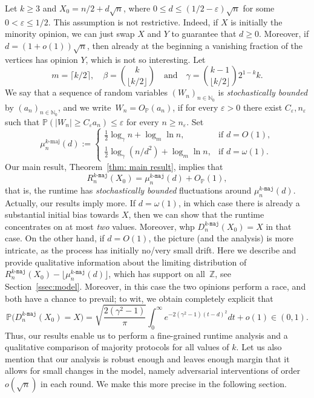 \documentclass[11pt]{article}
\newcommand{\Prob}{\mathbb{P}}
\numberwithin{theorem}{section}
\begin{document}
Let $k\geq 3$ and $X_0 = n/2 + d \sqrt{n}$, where $0 \le d \le (1/2-\varepsilon)\sqrt{n}$ for some $0<\varepsilon \leq 1/2$. This assumption is not restrictive. Indeed, if $X$ is initially the minority opinion, we can just swap $X$ and $Y$ to guarantee that $d \ge 0$. Moreover, if $d = (1+o(1))\sqrt{n}$, then already at the beginning a vanishing fraction of the vertices has opinion $Y$, which is not so interesting. Let
\[
m = \lceil k/2\rceil, \quad \beta =\binom{k}{\lfloor k/2 \rfloor} \quad \text{and} \quad \gamma = \binom{k-1}{\lfloor k/2\rfloor} 2^{1-k}k.
\]
We say that a sequence of random variables $(W_n)_{n\in \mathbb{N}_0}$ is \emph{stochastically bounded} by $(a_n)_{n \in \mathbb{N}_0}$, and we write~$W_n = O_\Prob(a_n)$, if for every $\varepsilon>0$ there exist $C_\varepsilon, n_\varepsilon$ such that $\Prob(|W_n|\ge C_\varepsilon a_n) \le \varepsilon$ for every $n\geq n_\varepsilon$. 
Set
\[
\mu_n^{\text{$k$-maj}}(d) :=
\begin{cases}
    \frac{1}{2}\log_\gamma n + \log_m \ln n, & \text{if } d = O(1), \\[1mm]
    \frac{1}{2}\log_\gamma(n/d^2) + \log_m \ln n, & \text{if } d = \omega(1).
\end{cases}
\]
Our main result, Theorem~\ref{thm: main result}, implies that 
\[
    R_n^{\texttt{$k$-maj}}(X_0) = \mu_n^{\texttt{$k$-maj}}(d) + O_\Prob(1),  
\]
that is, the runtime has \emph{stochastically bounded} fluctuations around $\mu_n^{\texttt{$k$-maj}}(d)$.
Actually, our results imply more. If $d = \omega(1)$, 
in which case there is already a substantial initial bias towards $X$,
then we can show that the runtime concentrates on at most \emph{two} values.
Moreover, whp  $D_n^{\texttt{$k$-maj}}(X_0) = X$ in that case. On the other hand, if $d = O(1)$, the picture (and the analysis) is more intricate, as the process has initially no/very small drift. Here we describe and provide qualitative information about the limiting distribution of $R_n^{\texttt{$k$-maj}}(X_0) - \lfloor\mu_n^{\texttt{$k$-maj}}(d)\rfloor$, which has support on all~$\mathbb{Z}$, see Section~\ref{ssec:model}. Moreover, in this case the two opinions perform a race, and both have a chance to prevail; to wit, we obtain  completely explicit that
\[
    \Prob\big(D_n^{\texttt{$k$-maj}}(X_0) = X\big) = \sqrt{\frac{2(\gamma^2-1)}{\pi}}\int_0^\infty e^{-2(\gamma^2-1)(t-d)^2} dt + o(1) \in (0,1).
\]
Thus, our results enable us to perform a fine-grained runtime analysis and a qualitative comparison of majority protocols for all values of $k$. Let us also mention that our analysis is robust enough and leaves enough margin that it allows for small changes in the model, namely adversarial interventions of order $o(\sqrt{n})$ in each round. We make this more precise in the following section.
\end{document}
